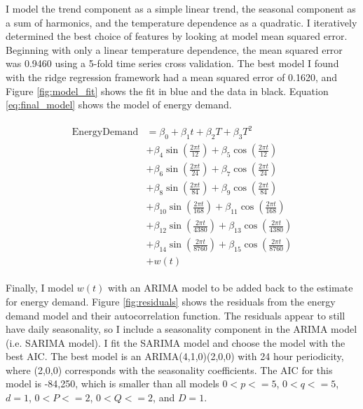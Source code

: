 \documentclass[12pt]{article}
\begin{document}
I model the trend component as a simple linear trend, the seasonal component as a sum of harmonics, and the temperature dependence as a quadratic. I iteratively determined the best choice of features by looking at model mean squared error. Beginning with only a linear temperature dependence, the mean squared error was 0.9460 using a 5-fold time series cross validation. The best model I found with the ridge regression framework had a mean squared error of 0.1620, and Figure \ref{fig:model_fit} shows the fit in blue and the data in black. Equation \ref{eq:final_model} shows the model of energy demand. 

\begin{align} \label{eq:final_model}
\begin{split}
    \text{EnergyDemand} &= \beta_0 + \beta_1 t + \beta_2 T + \beta_3 T^2 \\
    &+ \beta_4 \sin \left( \frac{2 \pi t}{12} \right) + \beta_5 \cos \left( \frac{2 \pi t}{12} \right) \\
    &+\beta_6 \sin \left( \frac{2 \pi t}{24} \right) + \beta_7 \cos \left( \frac{2 \pi t}{24} \right) \\
    &+ \beta_8 \sin \left( \frac{2 \pi t}{84} \right) + \beta_9 \cos \left( \frac{2 \pi t}{84} \right) \\
    &+ \beta_{10} \sin \left( \frac{2 \pi t}{168} \right) + \beta_{11} \cos \left( \frac{2 \pi t}{168} \right) \\
    &+ \beta_{12} \sin \left( \frac{2 \pi t}{4380} \right) + \beta_{13} \cos \left( \frac{2 \pi t}{4380} \right) \\
    &+ \beta_{14} \sin \left( \frac{2 \pi t}{8760} \right) + \beta_{15} \cos \left( \frac{2 \pi t}{8760} \right) \\
    &+ w(t)
\end{split}
\end{align}

Finally, I model $w(t)$ with an ARIMA model to be added back to the estimate for energy demand. Figure \ref{fig:residuals} shows the residuals from the energy demand model and their autocorrelation function. The residuals appear to still have daily seasonality, so I include a seasonality component in the ARIMA model (i.e. SARIMA model). I fit the SARIMA model and choose the model with the best AIC. The best model is an ARIMA(4,1,0)(2,0,0) with 24 hour periodicity, where (2,0,0) corresponds with the seasonality coefficients. The AIC for this model is -84,250, which is smaller than all models $0 < p <= 5$, $0 < q <=5$, $d = 1$, $0 < P <= 2$, $0 < Q <= 2$, and $D = 1$.
\end{document}
